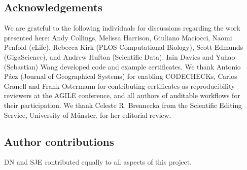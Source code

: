 \documentclass[12pt]{article}
\begin{document}
\subsection*{Acknowledgements}\label{acknowledgements}

We are grateful to the following individuals for discussions regarding
the work presented here: Andy Collings, Melissa Harrison, Giuliano
Maciocci, Naomi Penfold (eLife), Rebecca Kirk (PLOS Computational Biology), Scott
Edmunds (GigaScience), and Andrew Hufton (Scientific Data). Iain Davies and
Yuhao (Sebastian) Wang developed code and example certificates.
We thank Antonio P\'{a}ez (Journal of Geographical Systems) for enabling
CODECHECKs, Carlos Granell and Frank Ostermann for contributing
certificates as reproducibility reviewers at the AGILE conference, and 
all authors of auditable workflows for their participation.
We thank Celeste R. Brennecka from the Scientific Editing Service, University of M\"unster, for her editorial review. 

\subsection*{Author contributions}

DN and SJE contributed equally to all aspects of this project.

{\small
}
\end{document}
